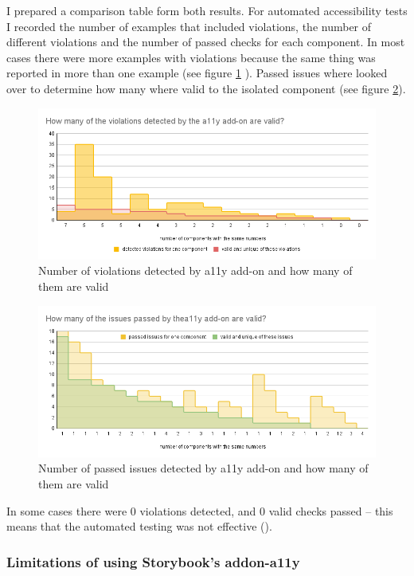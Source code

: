 \documentclass{master_thesis}
\begin{document}
I prepared a comparison table form both results. For automated accessibility tests I recorded the number of examples that included violations, the number of different violations and the number of passed checks for each component. In most cases there were more examples with violations because the same thing was reported in more than one example (see figure \ref{fig:audit-fail} ). Passed issues where looked over to determine how many where valid to the isolated component (see figure \ref{fig:audit-pass}).
\begin{figure}[h]
	\includegraphics[width=\textwidth]{img/audit_violations.png}
	\caption{Number of violations detected by a11y add-on and how many of them are valid}
	\label{fig:audit-fail}
\end{figure}
\begin{figure}[h]
	\includegraphics[width=\textwidth]{img/audit_passed.png}
	\caption{Number of passed issues detected by a11y add-on and how many of them are valid}
	\label{fig:audit-pass}
\end{figure}

In some cases there were 0 violations detected, and 0 valid checks passed – this means that the automated testing was not effective ().

\subsubsection{Limitations of using Storybook's addon-a11y}
\end{document}
